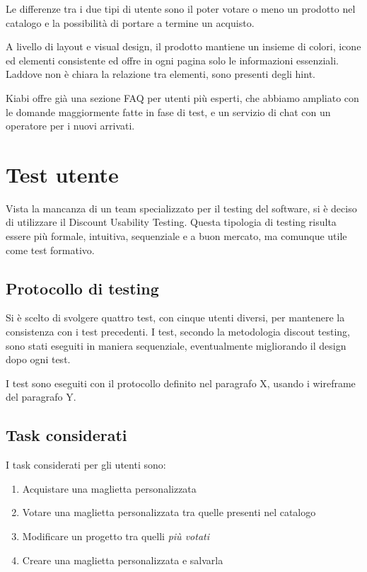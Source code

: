\documentclass[12pt,italian,]{report}
\providecommand{\tightlist}{%
  \setlength{\itemsep}{0pt}\setlength{\parskip}{0pt}}
\begin{document}
Le differenze tra i due tipi di utente sono il poter votare o meno un
prodotto nel catalogo e la possibilità di portare a termine un acquisto.

A livello di layout e visual design, il prodotto mantiene un insieme di
colori, icone ed elementi consistente ed offre in ogni pagina solo le
informazioni essenziali. Laddove non è chiara la relazione tra elementi,
sono presenti degli hint.

Kiabi offre già una sezione FAQ per utenti più esperti, che abbiamo
ampliato con le domande maggiormente fatte in fase di test, e un
servizio di chat con un operatore per i nuovi arrivati.

\hypertarget{test-utente}{%
\section{Test utente}\label{test-utente}}

Vista la mancanza di un team specializzato per il testing del software,
si è deciso di utilizzare il Discount Usability Testing. Questa
tipologia di testing risulta essere più formale, intuitiva, sequenziale
e a buon mercato, ma comunque utile come test formativo.

\hypertarget{protocollo-di-testing-1}{%
\subsection{Protocollo di testing}\label{protocollo-di-testing-1}}

Si è scelto di svolgere quattro test, con cinque utenti diversi, per
mantenere la consistenza con i test precedenti. I test, secondo la
metodologia discout testing, sono stati eseguiti in maniera
sequenziale, eventualmente migliorando il design dopo ogni test.

I test sono eseguiti con il protocollo definito nel paragrafo X, usando
i wireframe del paragrafo Y.

\hypertarget{task-considerati}{%
\subsection{Task considerati}\label{task-considerati}}

I task considerati per gli utenti sono:

\begin{enumerate}
\def\labelenumi{\arabic{enumi}.}
\tightlist
\item
  Acquistare una maglietta personalizzata
\item
  Votare una maglietta personalizzata tra quelle presenti nel catalogo
\item
  Modificare un progetto tra quelli \emph{più votati}
\item
  Creare una maglietta personalizzata e salvarla
\end{enumerate}
\end{document}
